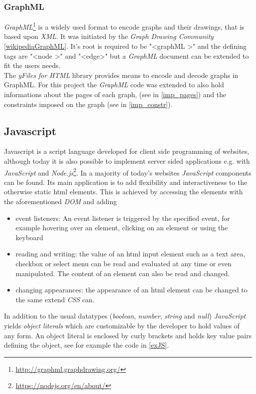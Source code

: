 \subsubsection{GraphML}
\textit{GraphML}\footnote{\url{http://graphml.graphdrawing.org/}} is a widely used format to encode graphs and their drawings, that is based upon \textit{XML}. It was initiated by the \textit{Graph Drawing Community} \ref{wikipediaGraphML}. It's root is required to be "\textless  graphML \textgreater" and the defining tags are "\textless  node \textgreater" and "\textless  edge\textgreater" but a  \textit{GraphML} document can be extended to fit the users needs.\\
The \textit{yFiles for HTML} library provides means to encode and decode graphs in GraphML. For this project the \textit{GraphML} code was extended to also hold informations about the pages of each graph, (see in \autoref{imp_pages}) and the constraints imposed on the graph (see in \autoref{imp_constr}).
\subsection{Javascript}
Javascript \cite{wiki-js, mdn-web-dokumentation,Ackermann2015} is a script language developed for client side programming of websites, although today it is also possible to implement server sided applications e.g. with \textit{JavaScript} and \textit{Node.js}\footnote{\url{https://nodejs.org/en/about/}}. In a majority of today's websites \textit{JavaScript} components can be found. Its main application is to add flexibility and interactiveness to the otherwise static html elements. This is achieved by accessing the elements with the aforementioned \textit{DOM} and adding 
\begin{itemize}
\item event listeners: An event listener is triggered by the specified event, for example hovering over an element, clicking on an element or using the keyboard
\item reading and writing: the value of an html input element such as a text area, checkbox or select menu can be read and evaluated at any time or even manipulated. The content of an element can also be read and changed.
\item changing appearances: the appearance of an html element can be changed to the same extend \textit{CSS} can.
\end{itemize}
In addition to the usual datatypes (\textit{boolean}, \textit{number}, \textit{string} and \textit{null}) \textit{JavaScript} yields \textit{object literals} which are customizable by the developer to hold values of any form. An object literal is enclosed by curly brackets and holds key value pairs defining the object, see for example the code in \autoref{exJS}.

